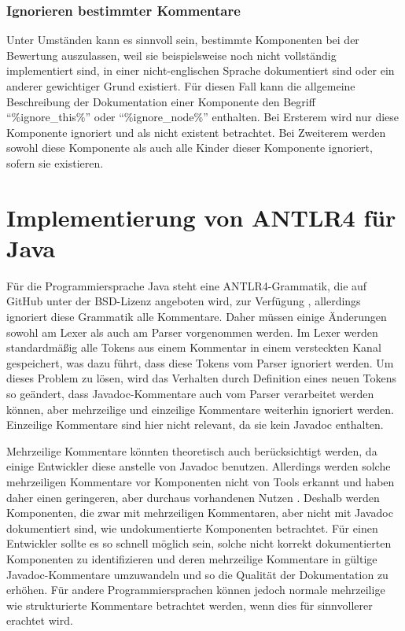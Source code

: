 \subsubsection{Ignorieren bestimmter Kommentare}

Unter Umständen kann es sinnvoll sein, bestimmte Komponenten bei der Bewertung auszulassen, weil sie beispielsweise noch nicht vollständig implementiert sind, in einer nicht-englischen Sprache dokumentiert sind oder ein anderer gewichtiger Grund existiert. Für diesen Fall kann die allgemeine Beschreibung der Dokumentation einer Komponente  den Begriff \enquote{\%ignore\_this\%} oder \enquote{\%ignore\_node\%} enthalten. Bei Ersterem wird nur diese Komponente ignoriert und als nicht existent betrachtet. Bei Zweiterem werden sowohl diese Komponente als auch alle Kinder dieser Komponente ignoriert, sofern sie existieren.




\section{Implementierung von ANTLR4 für Java}\label{chapter:antlr4_impl}

Für die Programmiersprache Java steht eine ANTLR4-Grammatik, die auf GitHub unter der BSD-Lizenz angeboten wird, zur Verfügung \cite{ANTLRgrammarforjava}, allerdings ignoriert diese Grammatik alle Kommentare. Daher müssen einige Änderungen sowohl am Lexer als auch am Parser vorgenommen werden. Im Lexer werden standardmäßig alle Tokens aus einem Kommentar in einem versteckten Kanal gespeichert, was dazu führt, dass diese Tokens vom Parser ignoriert werden. Um dieses Problem zu lösen, wird das Verhalten durch Definition eines neuen Tokens so geändert, dass Javadoc-Kommentare auch vom Parser verarbeitet werden können, aber mehrzeilige und einzeilige Kommentare weiterhin ignoriert werden. Einzeilige Kommentare sind hier nicht relevant, da sie kein Javadoc enthalten.

Mehrzeilige Kommentare könnten theoretisch auch berücksichtigt werden, da einige Entwickler diese anstelle von Javadoc benutzen. Allerdings werden solche mehrzeiligen Kommentare vor Komponenten nicht von Tools erkannt und haben daher einen geringeren, aber durchaus vorhandenen Nutzen \cite[S.~4]{HowDocumentationEvolvesoverTime}. Deshalb werden Komponenten, die zwar mit mehrzeiligen Kommentaren, aber nicht mit Javadoc dokumentiert sind, wie undokumentierte Komponenten betrachtet. Für einen Entwickler sollte es so schnell möglich sein, solche nicht korrekt dokumentierten Komponenten zu identifizieren und deren mehrzeilige Kommentare in gültige Javadoc-Kommentare umzuwandeln und so die Qualität der Dokumentation zu erhöhen. Für andere Programmiersprachen können jedoch normale mehrzeilige wie strukturierte Kommentare betrachtet werden, wenn dies für sinnvollerer erachtet wird.

